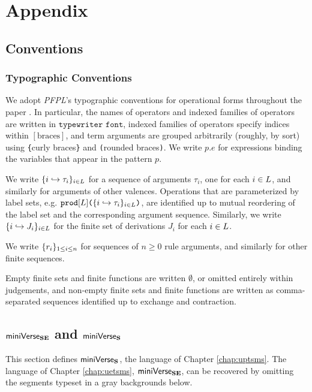 \part{Appendix}

\appendix
\chapter{Conventions}
\section{Typographic Conventions}\label{appendix:typographic-conventions}
We adopt \emph{PFPL}'s typographic conventions for operational forms throughout the paper \cite{pfpl}. In particular, the names of operators and indexed families of operators are written in $\texttt{typewriter font}$, indexed families of operators specify indices within $[\text{braces}]$, and term arguments are grouped arbitrarily (roughly, by sort) using \texttt{\{}curly braces\texttt{\}} and \texttt{(}rounded braces\texttt{)}. We write $p.e$ for expressions binding the variables that appear in the pattern $p$.

We write $\{i \hookrightarrow \tau_{i}\}_{i \in L}$ for a sequence of arguments $\tau_i$, one for each $i\in L$, and similarly for arguments of other valences. Operations  that are parameterized by label sets, e.g. $\texttt{prod}[L]\texttt{(}\{i \hookrightarrow \tau_{i}\}_{i \in L}\texttt{)}$, are identified up to mutual reordering of the label set and the corresponding argument sequence. Similarly, we write $\{i \hookrightarrow J_{i}\}_{i \in L}$ for the finite set of derivations $J_i$ for each $i \in L$.

We write $\{r_{i}\}_{1 \leq i \leq n}$ for sequences of $n \geq 0$ rule arguments, and similarly for other finite sequences. 

Empty finite sets and finite functions are written $\emptyset$, or omitted entirely within judgements, and non-empty finite sets and finite functions are written as comma-separated sequences identified up to exchange and contraction.

\chapter{\texorpdfstring{$\mathsf{miniVerse}_\textbf{SE}$ and $\mathsf{miniVerse}_\textbf{S}$}{miniVerseSE and miniVerseS}}\label{appendix:miniVerseSES}

This section defines $\mathsf{miniVerse}_\textbf{S}$, the language of Chapter \ref{chap:uptsms}. The language of Chapter \ref{chap:uetsms}, $\mathsf{miniVerse}_\textbf{SE}$, can be recovered by omitting the segments typeset in a gray backgrounds below.

